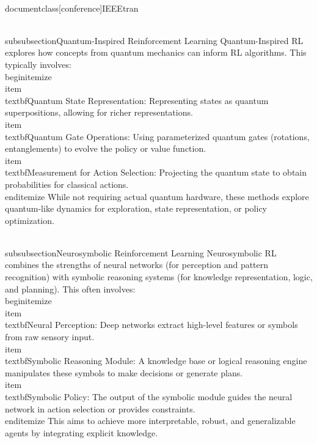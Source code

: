 \\documentclass[conference]{IEEEtran}
\begin{document}
\\subsubsection{Quantum-Inspired Reinforcement Learning}
Quantum-Inspired RL explores how concepts from quantum mechanics can inform RL algorithms. This typically involves:
\\begin{itemize}
    \\item \\textbf{Quantum State Representation:} Representing states as quantum superpositions, allowing for richer representations.
    \\item \\textbf{Quantum Gate Operations:} Using parameterized quantum gates (rotations, entanglements) to evolve the policy or value function.
    \\item \\textbf{Measurement for Action Selection:} Projecting the quantum state to obtain probabilities for classical actions.
\\end{itemize}
While not requiring actual quantum hardware, these methods explore quantum-like dynamics for exploration, state representation, or policy optimization.

\\subsubsection{Neurosymbolic Reinforcement Learning}
Neurosymbolic RL combines the strengths of neural networks (for perception and pattern recognition) with symbolic reasoning systems (for knowledge representation, logic, and planning). This often involves:
\\begin{itemize}
    \\item \\textbf{Neural Perception:} Deep networks extract high-level features or symbols from raw sensory input.
    \\item \\textbf{Symbolic Reasoning Module:} A knowledge base or logical reasoning engine manipulates these symbols to make decisions or generate plans.
    \\item \\textbf{Symbolic Policy:} The output of the symbolic module guides the neural network in action selection or provides constraints.
\\end{itemize}
This aims to achieve more interpretable, robust, and generalizable agents by integrating explicit knowledge.
\end{document}
